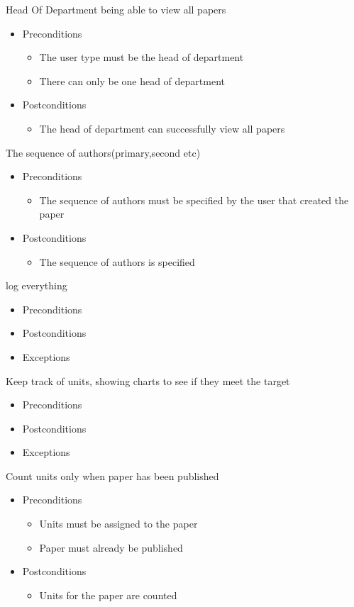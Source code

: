 \documentclass[a4paper,12pt]{article}
\begin{document}
Head Of Department being able to view all papers
\begin{itemize}
    \item Preconditions
    \begin{itemize}
        \item The user type must be the head of department
        \item There can only be one head of department
    \end{itemize}
    \item Postconditions
    \begin{itemize}
        \item The head of department can successfully view all papers
    \end{itemize}
\end{itemize}
The sequence of authors(primary,second etc)
\begin{itemize}
    \item Preconditions
    \begin{itemize}
        \item The sequence of authors must be specified by the user that created the paper
    \end{itemize}
    \item Postconditions
    \begin{itemize}
        \item The sequence of authors is specified
    \end{itemize}
\end{itemize}
log everything 
\begin{itemize}
    \item Preconditions
    \item Postconditions
    \item Exceptions
\end{itemize}
Keep track of units, showing charts to see if they meet the target
\begin{itemize}
    \item Preconditions
    \item Postconditions
    \item Exceptions
\end{itemize}
Count units only when paper has been published
\begin{itemize}
    \item Preconditions
    \begin{itemize}
        \item Units must be assigned to the paper
        \item Paper must already be published
    \end{itemize}
    \item Postconditions
    \begin{itemize}
        \item Units for the paper are counted
    \end{itemize}
\end{itemize}
\end{document}

